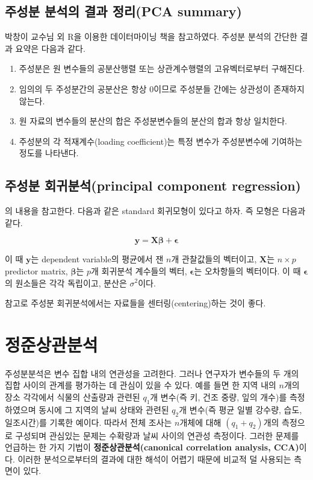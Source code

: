 \documentclass[b5paper,]{scrbook}
\theoremstyle{plain}
\theoremstyle{definition}
\numberwithin{equation}{section}
\begin{document}
\section{주성분 분석의 결과 정리(PCA summary)}\label{---pca-summary}

박창이 교수님 외 R을 이용한 데이터마이닝 책을 참고하였다. 주성분 분석의
간단한 결과 요약은 다음과 같다.

\begin{enumerate}
\def\labelenumi{\arabic{enumi}.}
\item
  주성분은 원 변수들의 공분산행렬 또는 상관계수행렬의 고유벡터로부터
  구해진다.
\item
  임의의 두 주성분간의 공분산은 항상 0이므로 주성분들 간에는 상관성이
  존재하지 않는다.
\item
  원 자료의 변수들의 분산의 합은 주성분변수들의 분산의 합과 항상
  일치한다.
\item
  주성분의 각 적재계수(loading coefficient)는 특정 변수가 주성분변수에
  기여하는 정도를 나타낸다.
\end{enumerate}

\section{주성분 회귀분석(principal component
regression)}\label{-principal-component-regression}

\citep{Jolliffe2002}의 내용을 참고한다. 다음과 같은 standard 회귀모형이
있다고 하자. 즉 모형은 다음과 같다.

\begin{equation}
\mathbf{y}=\mathbf{X}\boldsymbol{\beta}+\boldsymbol{\epsilon}
\label{eq:PCreg01}
\end{equation}

이 때 \(\mathbf{y}\)는 dependent variable의 평균에서 잰 \(n\)개
관찰값들의 벡터이고, \(\mathbf{X}\)는 \(n\times p\) predictor matrix,
\(\boldsymbol{\beta}\)는 \(p\)개 회귀분석 계수들의 벡터,
\(\boldsymbol{\epsilon}\)는 오차항들의 벡터이다. 이 때
\(\boldsymbol{\epsilon}\)의 원소들은 각각 독립이고, 분산은
\(\sigma^{2}\)이다.

참고로 주성분 회귀분석에서는 자료들을 센터링(centering)하는 것이 좋다.

\chapter{정준상관분석}\label{CCA}

주성분분석은 변수 집합 내의 연관성을 고려한다. 그러나 연구자가 변수들의
두 개의 집합 사이의 관계를 평가하는 데 관심이 있을 수 있다. 예를 들면 한
지역 내의 \(n\)개의 장소 각각에서 식물의 산출량과 관련된 \(q_{1}\)개
변수(즉 키, 건조 중량, 잎의 개수)를 측정하였으며 동시에 그 지역의 날씨
상태와 관련된 \(q_{2}\)개 변수(즉 평균 일별 강수량, 습도, 일조시간)를
기록한 예이다. 따라서 전체 조사는 \(n\)개체에 대해 \((q_{1}+q_{2})\)개의
측정으로 구성되며 관심있는 문제는 수확량과 날씨 사이의 연관성 측정이다.
그러한 문제를 언급하는 한 가지 기법이 \textbf{정준상관분석(canonical
correlation analysis, CCA)}이다. 이러한 분석으로부터의 결과에 대한
해석이 어렵기 때문에 비교적 덜 사용되는 측면이 있다.
\end{document}
